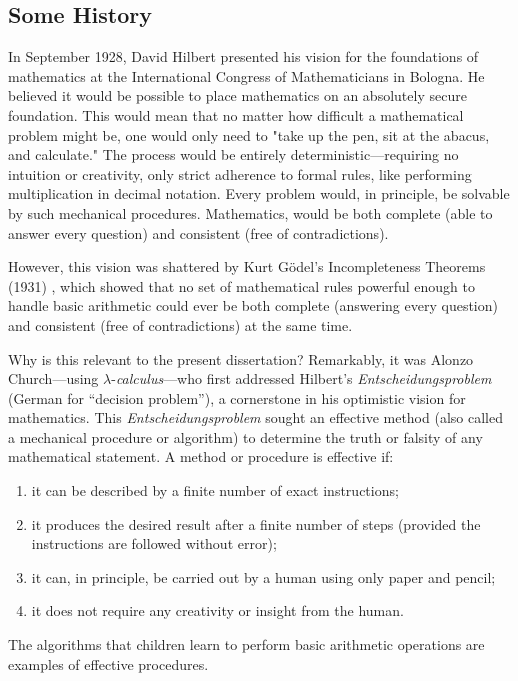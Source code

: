 \subsection*{Some History}

In September 1928, David Hilbert presented his vision for the foundations of mathematics at the International Congress of Mathematicians in Bologna. He believed it would be possible to place mathematics on an absolutely secure foundation. This would mean that no matter how difficult a mathematical problem might be, one would only need to "take up the pen, sit at the abacus, and calculate." The process would be entirely deterministic—requiring no intuition or creativity, only strict adherence to formal rules, like performing multiplication in decimal notation. Every problem would, in principle, be solvable by such mechanical procedures. Mathematics, would be both complete (able to answer every question) and consistent (free of contradictions). 

However, this vision was shattered by Kurt Gödel’s Incompleteness Theorems (1931) \cite{Godel}, which showed that no set of mathematical rules powerful enough to handle basic arithmetic could ever be both complete (answering every question) and consistent (free of contradictions) at the same time.


Why is this relevant to the present dissertation? Remarkably, it was Alonzo Church—using $\lambda$-\textit{calculus}—who first addressed Hilbert’s \emph{Entscheidungsproblem} (German for ``decision problem''), a cornerstone in his  optimistic vision for mathematics\cite{hilbert1938}. This \emph{Entscheidungsproblem} sought an effective method (also called a mechanical procedure or algorithm) to determine the truth or falsity of any mathematical statement. A method or procedure is effective if:
\begin{enumerate}
    \item it can be described by a finite number of exact instructions;
    \item it produces the desired result after a finite number of steps (provided the instructions are followed without error);
    \item it can, in principle, be carried out by a human using only paper and pencil;
    \item it does not require any creativity or insight from the human.
\end{enumerate}
The algorithms that children learn to perform basic arithmetic operations are examples of effective procedures.

